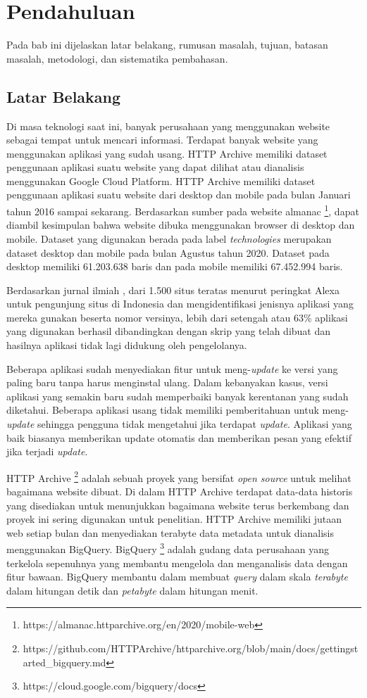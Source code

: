 \chapter{Pendahuluan}
\label{chap:intro}
Pada bab ini dijelaskan latar belakang, rumusan masalah, tujuan, batasan masalah, metodologi, dan sistematika pembahasan.
\section{Latar Belakang}
\label{sec:label}
Di masa teknologi saat ini, banyak perusahaan yang menggunakan website sebagai tempat untuk mencari informasi. Terdapat banyak website yang menggunakan aplikasi yang sudah usang. HTTP Archive memiliki dataset penggunaan aplikasi suatu website yang dapat dilihat atau dianalisis menggunakan Google Cloud Platform. HTTP Archive memiliki dataset penggunaan aplikasi suatu website dari desktop dan mobile pada bulan Januari tahun 2016 sampai sekarang. Berdasarkan sumber pada website almanac \footnote{https://almanac.httparchive.org/en/2020/mobile-web}, dapat diambil kesimpulan bahwa website dibuka menggunakan browser di desktop dan mobile. Dataset yang digunakan berada pada label \textit{technologies} merupakan dataset desktop dan mobile pada bulan Agustus tahun 2020. Dataset pada desktop memiliki 61.203.638 baris dan pada mobile memiliki 67.452.994 baris. 

Berdasarkan jurnal ilmiah \cite{pascal}, dari 1.500 situs teratas menurut peringkat Alexa untuk pengunjung situs di Indonesia dan mengidentifikasi jenisnya aplikasi yang mereka gunakan beserta nomor versinya, lebih dari setengah atau 63\% aplikasi yang digunakan berhasil dibandingkan dengan skrip yang telah dibuat dan hasilnya aplikasi tidak lagi didukung oleh pengelolanya.

Beberapa aplikasi sudah menyediakan fitur untuk meng-\textit{update} ke versi yang paling baru tanpa harus menginstal ulang. Dalam kebanyakan kasus, versi aplikasi yang semakin baru sudah memperbaiki banyak kerentanan yang sudah diketahui. Beberapa aplikasi usang tidak memiliki pemberitahuan untuk meng-\textit{update} sehingga pengguna tidak mengetahui jika terdapat \textit{update}. Aplikasi yang baik biasanya memberikan update otomatis dan memberikan pesan yang efektif jika terjadi \textit{update}. 

HTTP Archive \footnote{https://github.com/HTTPArchive/httparchive.org/blob/main/docs/gettingstarted_bigquery.md} adalah sebuah proyek yang bersifat \textit{open source} untuk melihat bagaimana website dibuat. Di dalam HTTP Archive terdapat data-data historis yang disediakan untuk menunjukkan bagaimana website terus berkembang dan proyek ini sering digunakan untuk penelitian. HTTP Archive memiliki jutaan web setiap bulan dan menyediakan terabyte data metadata untuk dianalisis menggunakan BigQuery. BigQuery \footnote{https://cloud.google.com/bigquery/docs} adalah gudang data perusahaan yang terkelola sepenuhnya yang membantu mengelola dan menganalisis data dengan fitur bawaan. BigQuery membantu dalam membuat \textit{query} dalam skala \textit{terabyte} dalam hitungan detik dan \textit{petabyte} dalam hitungan menit.

